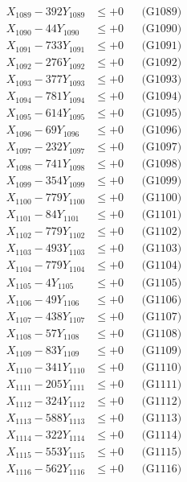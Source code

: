 \documentclass[a4paper,10pt]{article}
\begin{document}
{\begin{align}
X_{1089} - 392Y_{1089} &\leq +0 && \text{(G1089)} \\
X_{1090} - 44Y_{1090} &\leq +0 && \text{(G1090)} \\
\allowbreak
X_{1091} - 733Y_{1091} &\leq +0 && \text{(G1091)} \\
X_{1092} - 276Y_{1092} &\leq +0 && \text{(G1092)} \\
X_{1093} - 377Y_{1093} &\leq +0 && \text{(G1093)} \\
X_{1094} - 781Y_{1094} &\leq +0 && \text{(G1094)} \\
X_{1095} - 614Y_{1095} &\leq +0 && \text{(G1095)} \\
X_{1096} - 69Y_{1096} &\leq +0 && \text{(G1096)} \\
X_{1097} - 232Y_{1097} &\leq +0 && \text{(G1097)} \\
X_{1098} - 741Y_{1098} &\leq +0 && \text{(G1098)} \\
X_{1099} - 354Y_{1099} &\leq +0 && \text{(G1099)} \\
X_{1100} - 779Y_{1100} &\leq +0 && \text{(G1100)} \\
\allowbreak
X_{1101} - 84Y_{1101} &\leq +0 && \text{(G1101)} \\
X_{1102} - 779Y_{1102} &\leq +0 && \text{(G1102)} \\
X_{1103} - 493Y_{1103} &\leq +0 && \text{(G1103)} \\
X_{1104} - 779Y_{1104} &\leq +0 && \text{(G1104)} \\
X_{1105} - 4Y_{1105} &\leq +0 && \text{(G1105)} \\
X_{1106} - 49Y_{1106} &\leq +0 && \text{(G1106)} \\
X_{1107} - 438Y_{1107} &\leq +0 && \text{(G1107)} \\
X_{1108} - 57Y_{1108} &\leq +0 && \text{(G1108)} \\
X_{1109} - 83Y_{1109} &\leq +0 && \text{(G1109)} \\
X_{1110} - 341Y_{1110} &\leq +0 && \text{(G1110)} \\
\allowbreak
X_{1111} - 205Y_{1111} &\leq +0 && \text{(G1111)} \\
X_{1112} - 324Y_{1112} &\leq +0 && \text{(G1112)} \\
X_{1113} - 588Y_{1113} &\leq +0 && \text{(G1113)} \\
X_{1114} - 322Y_{1114} &\leq +0 && \text{(G1114)} \\
X_{1115} - 553Y_{1115} &\leq +0 && \text{(G1115)} \\
X_{1116} - 562Y_{1116} &\leq +0 && \text{(G1116)} \\

\end{align}}
\end{document}

